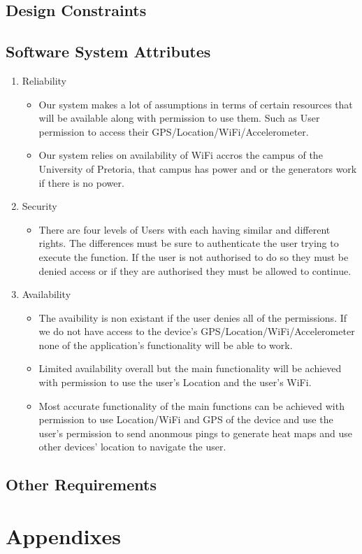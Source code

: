\documentclass[11pt]{article}
\begin{document}
		\subsection{Design Constraints}

		\subsection{Software System Attributes}
			\begin{enumerate}
				\item Reliability 
					\begin{itemize}
						\item Our system makes a lot of assumptions in terms of certain resources that will be available along with permission to use them. Such as User permission to access their GPS/Location/WiFi/Accelerometer.
						\item Our system relies on availability of WiFi accros the campus of the University of Pretoria, that campus has power and or the generators work if there is no power.
					\end{itemize}
				\item Security 
					\begin{itemize}
						\item There are four levels of Users with each having similar and different rights. The differences must be sure to authenticate the user trying to execute the function. If the user is not authorised to do so they must be denied access or if they are authorised they must be allowed to continue.
					\end{itemize}
				\item Availability
					\begin{itemize}
						\item The avaibility is non existant if the user denies all of the permissions. If we do not have access to the device's GPS/Location/WiFi/Accelerometer none of the application's functionality will be able to work.
						\item Limited availability overall but the main functionality will be achieved with permission to use the user's Location and the user's WiFi.
						\item Most accurate functionality of the main functions can be achieved with permission to use Location/WiFi and GPS of the device and use the user's permission to send anonmous pings to generate heat maps and use other devices' location to navigate the user.
					\end{itemize}
			\end{enumerate}
		\subsection{Other Requirements}

	\section{Appendixes}


	
\end{document}
